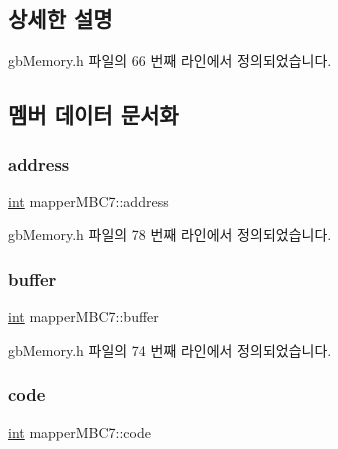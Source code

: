 \subsection{상세한 설명}


gb\+Memory.\+h 파일의 66 번째 라인에서 정의되었습니다.



\subsection{멤버 데이터 문서화}
\mbox{\label{structmapper_m_b_c7_a23b1a5a0926bb85d8e6d1fd3998914be}} 
\subsubsection{\texorpdfstring{address}{address}}
{\footnotesize\ttfamily \mbox{\hyperlink{_util_8cpp_a0ef32aa8672df19503a49fab2d0c8071}{int}} mapper\+M\+B\+C7\+::address}



gb\+Memory.\+h 파일의 78 번째 라인에서 정의되었습니다.

\mbox{\label{structmapper_m_b_c7_a2a78696abc5026b581f7d9b560f9957e}} 
\subsubsection{\texorpdfstring{buffer}{buffer}}
{\footnotesize\ttfamily \mbox{\hyperlink{_util_8cpp_a0ef32aa8672df19503a49fab2d0c8071}{int}} mapper\+M\+B\+C7\+::buffer}



gb\+Memory.\+h 파일의 74 번째 라인에서 정의되었습니다.

\mbox{\label{structmapper_m_b_c7_ad7fc3ef605f742be9754778297982441}} 
\subsubsection{\texorpdfstring{code}{code}}
{\footnotesize\ttfamily \mbox{\hyperlink{_util_8cpp_a0ef32aa8672df19503a49fab2d0c8071}{int}} mapper\+M\+B\+C7\+::code}




